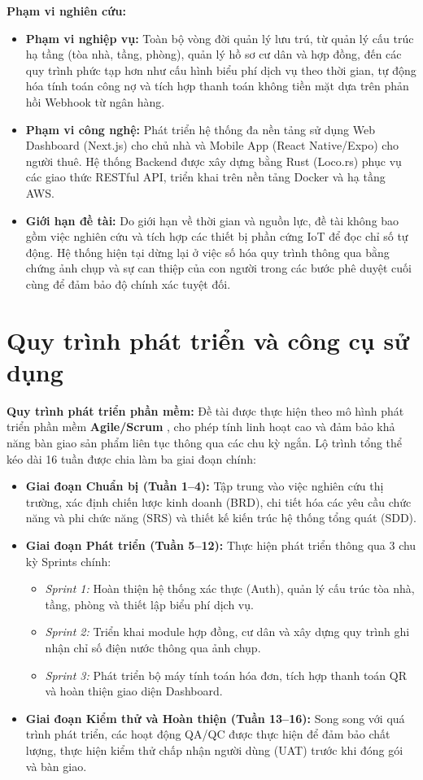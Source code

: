 \textbf{Phạm vi nghiên cứu:}
\begin{itemize}
    \item \textbf{Phạm vi nghiệp vụ:} Toàn bộ vòng đời quản lý lưu trú, từ quản lý cấu trúc hạ tầng (tòa nhà, tầng, phòng), quản lý hồ sơ cư dân và hợp đồng, đến các quy trình phức tạp hơn như cấu hình biểu phí dịch vụ theo thời gian, tự động hóa tính toán công nợ và tích hợp thanh toán không tiền mặt dựa trên phản hồi Webhook từ ngân hàng.
    \item \textbf{Phạm vi công nghệ:} Phát triển hệ thống đa nền tảng sử dụng Web Dashboard (Next.js) cho chủ nhà và Mobile App (React Native/Expo) cho người thuê. Hệ thống Backend được xây dựng bằng Rust (Loco.rs) phục vụ các giao thức RESTful API, triển khai trên nền tảng Docker và hạ tầng AWS.
    \item \textbf{Giới hạn đề tài:} Do giới hạn về thời gian và nguồn lực, đề tài không bao gồm việc nghiên cứu và tích hợp các thiết bị phần cứng IoT để đọc chỉ số tự động. Hệ thống hiện tại dừng lại ở việc số hóa quy trình thông qua bằng chứng ảnh chụp và sự can thiệp của con người trong các bước phê duyệt cuối cùng để đảm bảo độ chính xác tuyệt đối.
\end{itemize}

\section{Quy trình phát triển và công cụ sử dụng}

\textbf{Quy trình phát triển phần mềm:}
Đề tài được thực hiện theo mô hình phát triển phần mềm \textbf{Agile/Scrum} \cite{ScrumGuide}, cho phép tính linh hoạt cao và đảm bảo khả năng bàn giao sản phẩm liên tục thông qua các chu kỳ ngắn. Lộ trình tổng thể kéo dài 16 tuần được chia làm ba giai đoạn chính:
\begin{itemize}
    \item \textbf{Giai đoạn Chuẩn bị (Tuần 1--4):} Tập trung vào việc nghiên cứu thị trường, xác định chiến lược kinh doanh (BRD), chi tiết hóa các yêu cầu chức năng và phi chức năng (SRS) và thiết kế kiến trúc hệ thống tổng quát (SDD).
    \item \textbf{Giai đoạn Phát triển (Tuần 5--12):} Thực hiện phát triển thông qua 3 chu kỳ Sprints chính:
    \begin{itemize}
        \item \textit{Sprint 1:} Hoàn thiện hệ thống xác thực (Auth), quản lý cấu trúc tòa nhà, tầng, phòng và thiết lập biểu phí dịch vụ.
        \item \textit{Sprint 2:} Triển khai module hợp đồng, cư dân và xây dựng quy trình ghi nhận chỉ số điện nước thông qua ảnh chụp.
        \item \textit{Sprint 3:} Phát triển bộ máy tính toán hóa đơn, tích hợp thanh toán QR và hoàn thiện giao diện Dashboard.
    \end{itemize}
    \item \textbf{Giai đoạn Kiểm thử và Hoàn thiện (Tuần 13--16):} Song song với quá trình phát triển, các hoạt động QA/QC được thực hiện để đảm bảo chất lượng, thực hiện kiểm thử chấp nhận người dùng (UAT) trước khi đóng gói và bàn giao.
\end{itemize}

